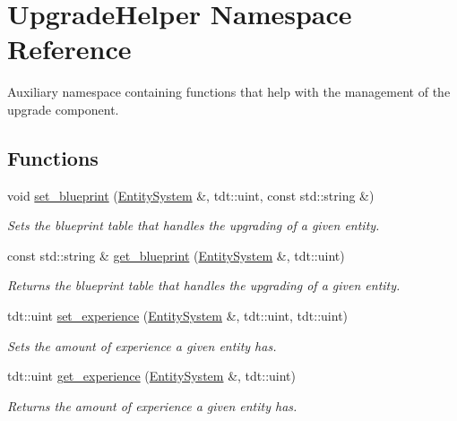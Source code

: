 \hypertarget{namespace_upgrade_helper}{}\section{Upgrade\+Helper Namespace Reference}
\label{namespace_upgrade_helper}


Auxiliary namespace containing functions that help with the management of the upgrade component.  


\subsection*{Functions}
\begin{DoxyCompactItemize}
\item 
void \hyperlink{namespace_upgrade_helper_a839d7c49eec55a027cdf0b181c62912f}{set\+\_\+blueprint} (\hyperlink{class_entity_system}{Entity\+System} \&, tdt\+::uint, const std\+::string \&)
\begin{DoxyCompactList}\small\item\em Sets the blueprint table that handles the upgrading of a given entity. \end{DoxyCompactList}\item 
const std\+::string \& \hyperlink{namespace_upgrade_helper_a8fd09245424bc7d16397eaa2a3111562}{get\+\_\+blueprint} (\hyperlink{class_entity_system}{Entity\+System} \&, tdt\+::uint)
\begin{DoxyCompactList}\small\item\em Returns the blueprint table that handles the upgrading of a given entity. \end{DoxyCompactList}\item 
tdt\+::uint \hyperlink{namespace_upgrade_helper_a0dfefa872cb7130a0a21421d5164f2ac}{set\+\_\+experience} (\hyperlink{class_entity_system}{Entity\+System} \&, tdt\+::uint, tdt\+::uint)
\begin{DoxyCompactList}\small\item\em Sets the amount of experience a given entity has. \end{DoxyCompactList}\item 
tdt\+::uint \hyperlink{namespace_upgrade_helper_a6979f679be0af44942e3b397f363db65}{get\+\_\+experience} (\hyperlink{class_entity_system}{Entity\+System} \&, tdt\+::uint)
\begin{DoxyCompactList}\small\item\em Returns the amount of experience a given entity has. \end{DoxyCompactList}\item 

\end{DoxyCompactItemize}
